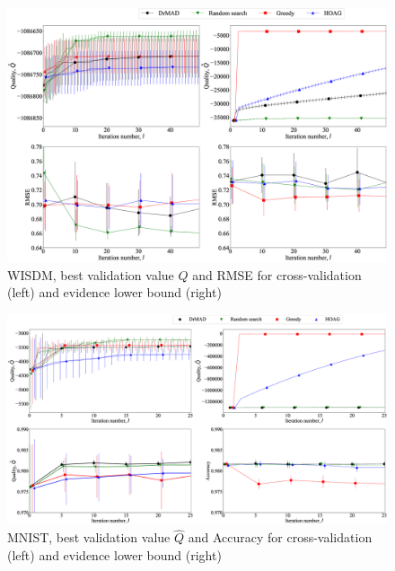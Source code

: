 \documentclass[smallcondensed]{svjour3}
\begin{document}
    \begin{figure}

    \includegraphics[width=\linewidth]{plots/Fig_wisdm2.eps}
\caption{WISDM,  best validation value $\hat{Q}$ and RMSE  for cross-validation (left) and evidence lower bound (right)}    
\label{fig:wisdm}
    
    \end{figure}


    \begin{figure}

    \includegraphics[width=\linewidth]{plots/Fig_mnist2.eps}

    \caption{MNIST, best validation value  $\hat{Q}$ and Accuracy  for cross-validation (left) and evidence lower bound (right)}
    \label{fig:mnist}
    \end{figure}
\end{document}
